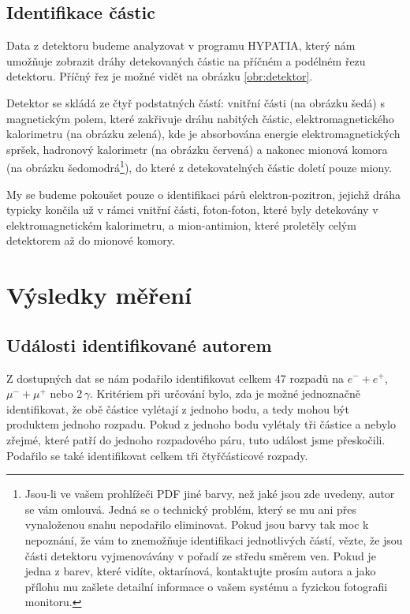 \documentclass[10pt,a4paper]{article}
\newcommand{\°}{\degree}
\begin{document}
\vspace{-2\baselineskip}
\subsection{Identifikace částic}
Data z detektoru budeme analyzovat v programu HYPATIA, který nám umožňuje zobrazit dráhy detekovaných částic na příčném a podélném řezu detektoru. Příčný řez je možné vidět na obrázku \ref{obr:detektor}.

Detektor se skládá ze čtyř podstatných částí: vnitřní části (na obrázku šedá) s magnetickým polem, které zakřivuje dráhu nabitých částic, elektromagnetického kalorimetru (na obrázku zelená), kde je absorbována energie elektromagnetických spršek, hadronový kalorimetr (na obrázku červená) a nakonec mionová komora (na obrázku šedomodrá\footnote{Jsou-li ve vašem prohlížeči PDF jiné barvy, než jaké jsou zde uvedeny, autor se vám omlouvá. Jedná se o technický problém, který se mu ani přes vynaloženou snahu nepodařilo eliminovat. Pokud jsou barvy tak moc k nepoznání, že vám to znemožňuje identifikaci jednotlivých částí, vězte, že jsou části detektoru vyjmenovávány v pořadí ze středu směrem ven. Pokud je jedna z barev, které vidíte, oktarínová, kontaktujte prosím autora a jako přílohu mu zašlete detailní informace o vašem systému a fyzickou fotografii monitoru.}), do které z detekovatelných částic doletí pouze miony.

My se budeme pokoušet pouze o identifikaci párů elektron-pozitron, jejichž dráha typicky končila už v rámci vnitřní části, foton-foton, které byly detekovány v elektromagnetickém kalorimetru, a mion-antimion, které proletěly celým detektorem až do mionové komory.


\section{Výsledky měření}

\subsection{Události identifikované autorem}
Z dostupných dat se nám podařilo identifikovat celkem 47 rozpadů na $e^- + e^+$, $\mu^- + \mu^+$ nebo $2 \, \gamma$. Kritériem při určování bylo, zda je možné jednoznačně identifikovat, že obě částice vylétají z jednoho bodu, a tedy mohou být produktem jednoho rozpadu. Pokud z jednoho bodu vylétaly tři částice a nebylo zřejmé, které patří do jednoho rozpadového páru, tuto událost jsme přeskočili. Podařilo se také identifikovat celkem tři čtyřčásticové rozpady.
\end{document}
